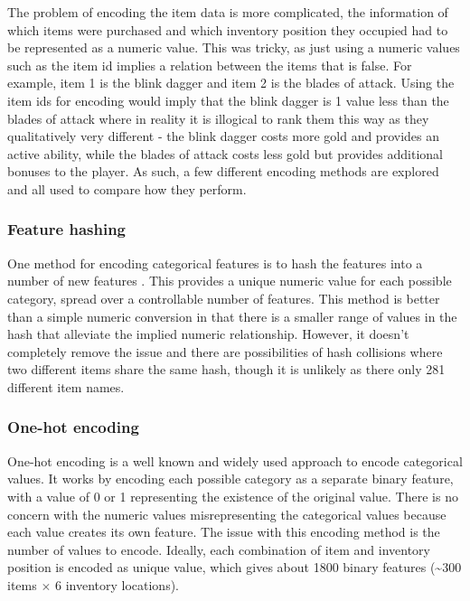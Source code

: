\documentclass[Report.tex]{subfiles}
\begin{document}
The problem of encoding the item data is more complicated, the information of which items were purchased and which inventory position they occupied had to be represented as a numeric value. This was tricky, as just using a numeric values such as the item id implies a relation between the items that is false. For example, item 1 is the blink dagger and item 2 is the blades of attack. Using the item ids for encoding would imply that the blink dagger is 1 value less than the blades of attack where in reality it is illogical to rank them this way as they qualitatively very different - the blink dagger costs more gold and provides an active ability, while the blades of attack costs less gold but provides additional bonuses to the player. As such, a few different encoding methods are explored and all used to compare how they perform. 


\subsubsection{Feature hashing}
One method for encoding categorical features is to hash the features into a number of new features \cite{feature-hashing}. This provides a unique numeric value for each possible category, spread over a controllable number of features. This method is better than a simple numeric conversion in that there is a smaller range of values in the hash that alleviate the implied numeric relationship. However, it doesn't completely remove the issue and there are possibilities of hash collisions where two different items share the same hash, though it is unlikely as there only 281 different item names. 

\subsubsection{One-hot encoding}
One-hot encoding is a well known and widely used approach to encode categorical values. It works by encoding each possible category as a separate binary feature, with a value of 0 or 1 representing the existence of the original value. There is no concern with the numeric values misrepresenting the categorical values because each value creates its own feature. The issue with this encoding method is the number of values to encode. Ideally, each combination of item and inventory position is encoded as unique value, which gives about 1800 binary features (\textasciitilde{}300 items $\times$ 6 inventory locations). 
\end{document}
